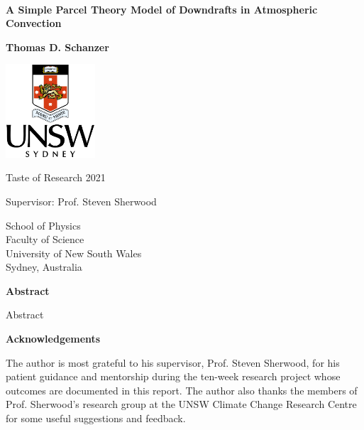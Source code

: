 \documentclass[12pt,titlepage]{article}
\begin{document}
\hypersetup{pageanchor=false}
\begin{titlepage}
    \begin{center}
        ~

        \vspace{3cm}
        \Huge
        \textbf{%
        	A Simple Parcel Theory Model of Downdrafts in Atmospheric
        	Convection}
        
        \vspace{0.75cm}
        \Large
        \textbf{Thomas D. Schanzer}
            
        \vfill
            
        \includegraphics[width=0.25\textwidth]{figures/unsw}

        \vspace{1cm}

        \large    
        Taste of Research 2021

        Supervisor: Prof. Steven Sherwood

        \vspace{1cm}
            
        \large
        School of Physics\\
        Faculty of Science\\
        University of New South Wales\\
        Sydney, Australia\\
    \end{center}
\end{titlepage}

\hypersetup{pageanchor=true}
\addtocounter{page}{1}
\begin{center}
	\large
	\textbf{Abstract}
\end{center}
Abstract

\begin{center}
	\large
	\textbf{Acknowledgements}
\end{center}
The author is most grateful to his supervisor, Prof. Steven Sherwood, for
his patient guidance and mentorship during the ten-week research project
whose outcomes are documented in this report. The author also thanks
the members of Prof. Sherwood's research group at the UNSW Climate
Change Research Centre for some useful suggestions and feedback.
\end{document}
